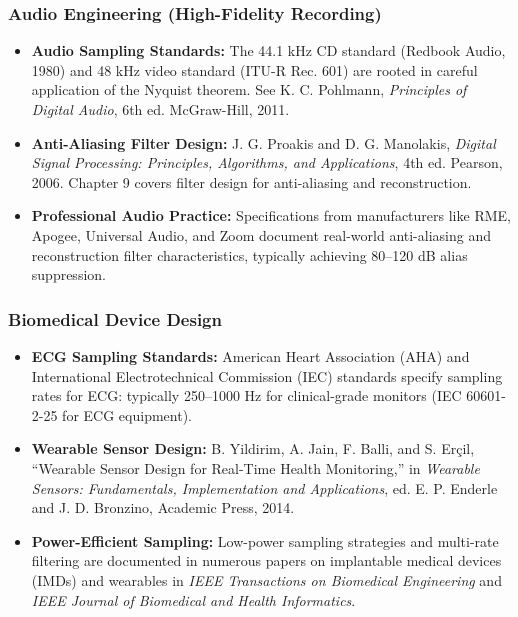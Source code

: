\documentclass[11pt,letterpaper]{article}
\begin{document}
\subsubsection*{Audio Engineering (High-Fidelity Recording)}

\begin{itemize}
    \item \textbf{Audio Sampling Standards:} The 44.1 kHz CD standard (Redbook Audio, 1980) and 48 kHz video standard (ITU-R Rec. 601) are rooted in careful application of the Nyquist theorem. See K. C. Pohlmann, \textit{Principles of Digital Audio}, 6th ed. McGraw-Hill, 2011.

    \item \textbf{Anti-Aliasing Filter Design:} J. G. Proakis and D. G. Manolakis, \textit{Digital Signal Processing: Principles, Algorithms, and Applications}, 4th ed. Pearson, 2006. Chapter 9 covers filter design for anti-aliasing and reconstruction.

    \item \textbf{Professional Audio Practice:} Specifications from manufacturers like RME, Apogee, Universal Audio, and Zoom document real-world anti-aliasing and reconstruction filter characteristics, typically achieving 80--120 dB alias suppression.
\end{itemize}

\subsubsection*{Biomedical Device Design}

\begin{itemize}
    \item \textbf{ECG Sampling Standards:} American Heart Association (AHA) and International Electrotechnical Commission (IEC) standards specify sampling rates for ECG: typically 250--1000 Hz for clinical-grade monitors (IEC 60601-2-25 for ECG equipment).

    \item \textbf{Wearable Sensor Design:} B. Yildirim, A. Jain, F. Balli, and S. Erçil, ``Wearable Sensor Design for Real-Time Health Monitoring,'' in \textit{Wearable Sensors: Fundamentals, Implementation and Applications}, ed. E. P. Enderle and J. D. Bronzino, Academic Press, 2014.

    \item \textbf{Power-Efficient Sampling:} Low-power sampling strategies and multi-rate filtering are documented in numerous papers on implantable medical devices (IMDs) and wearables in \textit{IEEE Transactions on Biomedical Engineering} and \textit{IEEE Journal of Biomedical and Health Informatics}.
\end{itemize}
\end{document}
